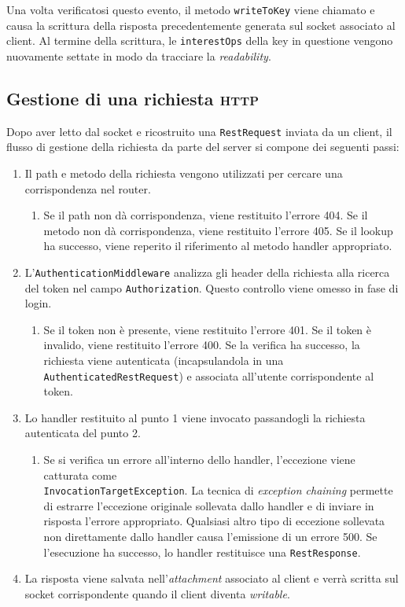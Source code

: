 \documentclass[a4paper,8pt]{article} %
\def\code#1{\texttt{#1}}
\begin{document}
\par Una volta verificatosi questo evento, il metodo \code{writeToKey} viene chiamato e causa la scrittura della risposta precedentemente generata sul socket associato al client. Al termine della scrittura, le \code{interestOps} della key in questione
vengono nuovamente settate in modo da tracciare la \emph{readability}.

\subsection{Gestione di una richiesta \textsc{http}}
\label{sec:http_flow}

Dopo aver letto dal socket e ricostruito una \code{RestRequest} inviata da un client, il flusso di gestione della richiesta da parte del server si compone dei seguenti passi:
\begin{enumerate}
    \item Il path e metodo della richiesta vengono utilizzati per cercare una corrispondenza nel router.
          \begin{enumerate}
              \item Se il path non dà corrispondenza, viene restituito l'errore 404. Se il metodo non dà corrispondenza, viene restituito l'errore 405. Se il lookup ha successo, viene reperito il riferimento al metodo handler appropriato.
          \end{enumerate}
    \item L'\code{AuthenticationMiddleware} analizza gli header della richiesta alla ricerca del token nel campo \code{Authorization}. Questo controllo viene omesso in fase di login.
          \begin{enumerate}
              \item Se il token non è presente, viene restituito l'errore 401. Se il token è invalido, viene restituito l'errore 400. Se la verifica ha successo, la richiesta viene autenticata (incapsulandola in una \code{AuthenticatedRestRequest}) e associata all'utente corrispondente al token.
          \end{enumerate}
    \item Lo handler restituito al punto 1 viene invocato passandogli la richiesta autenticata del punto 2.
          \begin{enumerate}
              \item Se si verifica un errore all'interno dello handler, l'eccezione viene catturata come\\ \code{InvocationTargetException}. La tecnica di \emph{exception chaining} permette di estrarre l'eccezione originale
                    sollevata dallo handler e di inviare in risposta l'errore appropriato. Qualsiasi altro tipo di eccezione sollevata non direttamente dallo handler causa l'emissione di un errore 500. Se l'esecuzione ha successo, lo handler restituisce una \code{RestResponse}.
          \end{enumerate}
    \item La risposta viene salvata nell'\emph{attachment} associato al client e verrà scritta sul socket corrispondente quando il client diventa \emph{writable}.
\end{enumerate}
\end{document}
